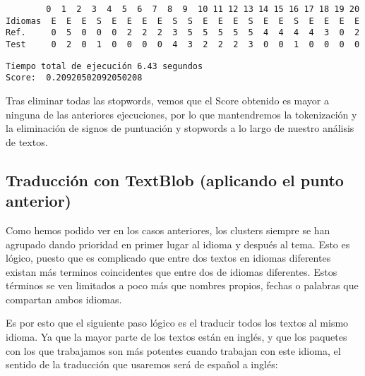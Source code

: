 \documentclass[11pt]{article}
\begin{document}
    \begin{verbatim}
        0  1  2  3  4  5  6  7  8  9  10 11 12 13 14 15 16 17 18 19 20
Idiomas  E  E  E  S  E  E  E  E  S  S  E  E  E  S  E  E  S  E  E  E  E
Ref.     0  5  0  0  0  2  2  2  3  5  5  5  5  5  4  4  4  4  3  0  2
Test     0  2  0  1  0  0  0  0  4  3  2  2  2  3  0  0  1  0  0  0  0
    \end{verbatim}


    \begin{Verbatim}[commandchars=\\\{\}]
Tiempo total de ejecución 6.43 segundos
Score:  0.20920502092050208

    \end{Verbatim}

    Tras eliminar todas las stopwords, vemos que el Score obtenido es mayor
a ninguna de las anteriores ejecuciones, por lo que mantendremos la
tokenización y la eliminación de signos de puntuación y stopwords a lo
largo de nuestro análisis de textos.

    \subsection{Traducción con TextBlob (aplicando el punto anterior)}

    Como hemos podido ver en los casos anteriores, los clusters siempre se
han agrupado dando prioridad en primer lugar al idioma y después al
tema. Esto es lógico, puesto que es complicado que entre dos textos en
idiomas diferentes existan más terminos coincidentes que entre dos de
idiomas diferentes. Estos términos se ven limitados a poco más que
nombres propios, fechas o palabras que compartan ambos idiomas.

Es por esto que el siguiente paso lógico es el traducir todos los textos
al mismo idioma. Ya que la mayor parte de los textos están en inglés, y
que los paquetes con los que trabajamos son más potentes cuando trabajan
con este idioma, el sentido de la traducción que usaremos será de
español a inglés:
\end{document}
